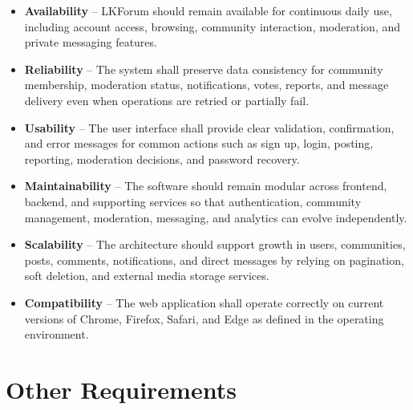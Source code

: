 \documentclass{scrreprt}
\begin{document}
\begin{itemize}[leftmargin=2cm]

    \item[\textbf{QA-1:}] \textbf{Availability} -- LKForum should remain available for continuous daily use, including account access, browsing, community interaction, moderation, and private messaging features.

    \item[\textbf{QA-2:}] \textbf{Reliability} -- The system shall preserve data consistency for community membership, moderation status, notifications, votes, reports, and message delivery even when operations are retried or partially fail.

    \item[\textbf{QA-3:}] \textbf{Usability} -- The user interface shall provide clear validation, confirmation, and error messages for common actions such as sign up, login, posting, reporting, moderation decisions, and password recovery.

    \item[\textbf{QA-4:}] \textbf{Maintainability} -- The software should remain modular across frontend, backend, and supporting services so that authentication, community management, moderation, messaging, and analytics can evolve independently.

    \item[\textbf{QA-5:}] \textbf{Scalability} -- The architecture should support growth in users, communities, posts, comments, notifications, and direct messages by relying on pagination, soft deletion, and external media storage services.

    \item[\textbf{QA-6:}] \textbf{Compatibility} -- The web application shall operate correctly on current versions of Chrome, Firefox, Safari, and Edge as defined in the operating environment.

\end{itemize}

\chapter{Other Requirements}
\end{document}
